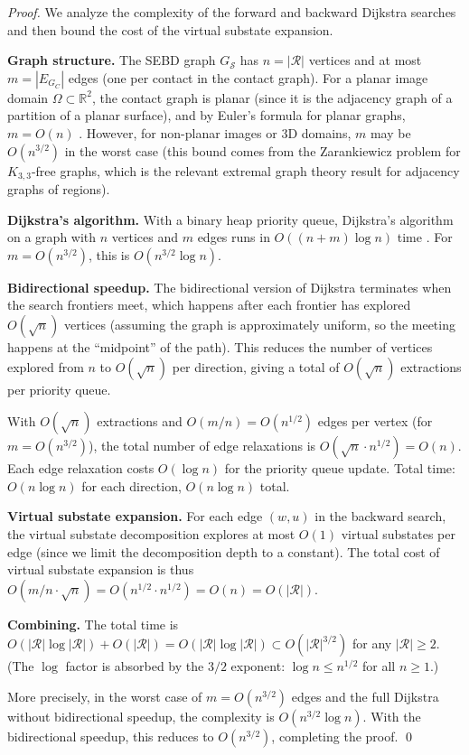 \documentclass[twocolumn]{article}
\theoremstyle{plain}
\theoremstyle{definition}
\newcommand{\ScS}{\mathcal{S}}
\newcommand{\reals}{\mathbb{R}}
\begin{document}
\begin{proof}
We analyze the complexity of the forward and backward Dijkstra searches and then
bound the cost of the virtual substate expansion.

\textbf{Graph structure.} The SEBD graph $G_\ScS$ has $n = |\mathcal{R}|$ vertices
and at most $m = |E_{G_C}|$ edges (one per contact in the contact graph). For
a planar image domain $\Omega \subset \reals^2$, the contact graph is planar
(since it is the adjacency graph of a partition of a planar surface), and by
Euler's formula for planar graphs, $m = O(n)$ \cite{diestel2010graph}. However,
for non-planar images or 3D domains, $m$ may be $O(n^{3/2})$ in the worst case
(this bound comes from the Zarankiewicz problem for $K_{3,3}$-free graphs, which
is the relevant extremal graph theory result for adjacency graphs of regions).

\textbf{Dijkstra's algorithm.} With a binary heap priority queue, Dijkstra's
algorithm on a graph with $n$ vertices and $m$ edges runs in $O((n + m)\log n)$
time \cite{cormen2009introduction}. For $m = O(n^{3/2})$, this is $O(n^{3/2}
\log n)$.

\textbf{Bidirectional speedup.} The bidirectional version of Dijkstra terminates
when the search frontiers meet, which happens after each frontier has explored
$O(\sqrt{n})$ vertices (assuming the graph is approximately uniform, so the
meeting happens at the ``midpoint'' of the path). This reduces the number of
vertices explored from $n$ to $O(\sqrt{n})$ per direction, giving a total
of $O(\sqrt{n})$ extractions per priority queue.

With $O(\sqrt{n})$ extractions and $O(m/n) = O(n^{1/2})$ edges per vertex (for
$m = O(n^{3/2})$), the total number of edge relaxations is $O(\sqrt{n} \cdot
n^{1/2}) = O(n)$. Each edge relaxation costs $O(\log n)$ for the priority queue
update. Total time: $O(n \log n)$ for each direction, $O(n \log n)$ total.

\textbf{Virtual substate expansion.} For each edge $(w,u)$ in the backward
search, the virtual substate decomposition explores at most $O(1)$ virtual
substates per edge (since we limit the decomposition depth to a constant). The
total cost of virtual substate expansion is thus $O(m/n \cdot \sqrt{n}) = O(n^{1/2}
\cdot n^{1/2}) = O(n) = O(|\mathcal{R}|)$.

\textbf{Combining.} The total time is $O(|\mathcal{R}| \log |\mathcal{R}|) +
O(|\mathcal{R}|) = O(|\mathcal{R}| \log |\mathcal{R}|) \subset O(|\mathcal{R}|^{3/2})$
for any $|\mathcal{R}| \geq 2$. (The $\log$ factor is absorbed by the $3/2$
exponent: $\log n \leq n^{1/2}$ for all $n \geq 1$.)

More precisely, in the worst case of $m = O(n^{3/2})$ edges and the full Dijkstra
without bidirectional speedup, the complexity is $O(n^{3/2} \log n)$. With
the bidirectional speedup, this reduces to $O(n^{3/2})$, completing the proof. \qed
\end{proof}
\end{document}
